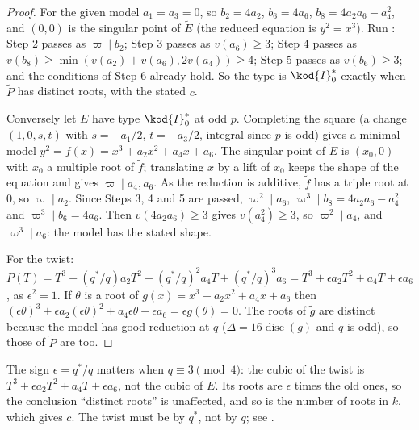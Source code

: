 \begin{proof}
For the given model $a_1=a_3=0$, so $b_2=4a_2$, $b_6=4a_6$, $b_8=4a_2a_6-a_4^2$, and $(0,0)$ is the singular point of
$\tilde E$ (the reduced equation is $y^2=x^3$). Run : Step 2 passes as
$\varpi\mid b_2$; Step 3 passes as $v(a_6)\ge3$; Step 4 passes as $v(b_8)\ge\min(v(a_2)+v(a_6),2v(a_4))\ge4$; Step 5
passes as $v(b_6)\ge3$; and the conditions of Step 6 already hold. So the type is $\kod{I}_0^*$ exactly when $\tilde P$
has distinct roots, with the stated $c$.

Conversely let $E$ have type $\kod{I}_0^*$ at odd $p$. Completing the square (a change $(1,0,s,t)$ with
$s=-a_1/2$, $t=-a_3/2$, integral since $p$ is odd) gives a minimal model $y^2=f(x)=x^3+a_2x^2+a_4x+a_6$. The singular point
of $\tilde E$ is $(x_0,0)$ with $x_0$ a multiple root of $\tilde f$; translating $x$ by a lift of $x_0$ keeps the shape
of the equation and gives $\varpi\mid a_4,a_6$. As the reduction is additive, $\tilde f$ has a triple root at $0$, so
$\varpi\mid a_2$. Since Steps 3, 4 and 5 are passed, $\varpi^2\mid a_6$, $\varpi^3\mid b_8=4a_2a_6-a_4^2$ and $\varpi^3\mid b_6=4a_6$.
Then $v(4a_2a_6)\ge3$ gives $v(a_4^2)\ge3$, so $\varpi^2\mid a_4$, and $\varpi^3\mid a_6$: the model has the stated shape.

For the twist: $P(T)=T^3+(q^*/q)a_2T^2+(q^*/q)^2a_4T+(q^*/q)^3a_6=T^3+\epsilon a_2T^2+a_4T+\epsilon a_6$, as $\epsilon^2=1$.
If $\theta$ is a root of $g(x)=x^3+a_2x^2+a_4x+a_6$ then
$(\epsilon\theta)^3+\epsilon a_2(\epsilon\theta)^2+a_4\epsilon\theta+\epsilon a_6=\epsilon g(\theta)=0$. The roots of $\tilde g$ are distinct because the
model has good reduction at $q$ ($\Delta=16\operatorname{disc}(g)$ and $q$ is odd), so those of $\tilde P$ are too.
\end{proof}

\begin{warning}\label{warn:reduction:sign}
The sign $\epsilon=q^*/q$ matters when $q\equiv3\pmod4$: the cubic of the twist is $T^3+\epsilon a_2T^2+a_4T+\epsilon a_6$, not
the cubic of $E$. Its roots are $\epsilon$ times the old ones, so the conclusion ``distinct roots'' is unaffected, and so is the
number of roots in $k$, which gives $c$. The twist must be by $q^*$, not by $q$; see
.
\end{warning}

